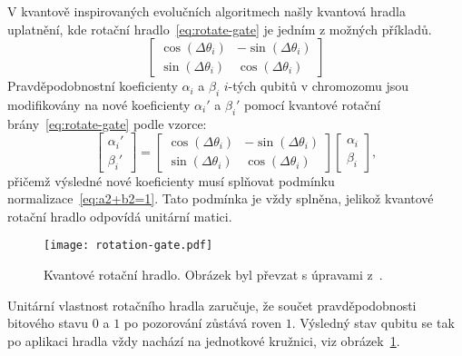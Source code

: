 V kvantově inspirovaných evolučních algoritmech našly kvantová hradla uplatnění, kde rotační hradlo~\ref{eq:rotate-gate} je jedním z možných příkladů.
\begin{equation}\label{eq:rotate-gate}
    \begin{bmatrix}
        \cos{\left( \Delta\theta_i \right)} & - \sin{\left( \Delta\theta_i \right)} \\
        \sin{\left( \Delta\theta_i \right)} &   \cos{\left( \Delta\theta_i \right)}
    \end{bmatrix}
\end{equation}
Pravděpodobnostní koeficienty $\alpha_i$ a $\beta_i$ $i$-tých qubitů v chromozomu jsou modifikovány na nové koeficienty $\alpha_i'$ a $\beta_i'$ pomocí kvantové rotační brány~\ref{eq:rotate-gate} podle vzorce: 
\begin{equation}\label{eq:rotation-gate-angles}
    \begin{bmatrix}
        \alpha_i' \\
        \beta_i' 
    \end{bmatrix}
    =
    \begin{bmatrix}
        \cos{\left( \Delta\theta_i \right)} & - \sin{\left( \Delta\theta_i \right)} \\
        \sin{\left( \Delta\theta_i \right)} &   \cos{\left( \Delta\theta_i \right)}
    \end{bmatrix}
    \begin{bmatrix}
        \alpha_i \\
        \beta_i 
    \end{bmatrix},
\end{equation}
přičemž výsledné nové koeficienty musí splňovat podmínku normalizace~\ref{eq:a2+b2=1}. 
Tato podmínka je vždy splněna, jelikož kvantové rotační hradlo odpovídá unitární matici. 
\begin{figure}[ht!]
    \centering
    \texttt{[image: rotation-gate.pdf]}
    \caption{Kvantové rotační hradlo. Obrázek byl převzat s úpravami z~\cite{NaturalComputing}.}
    \label{fig:rotation-gate}
\end{figure}
Unitární vlastnost rotačního hradla zaručuje, že součet pravděpodobnosti bitového stavu $0$ a $1$ po pozorování zůstává roven $1$. 
Výsledný stav qubitu se tak po aplikaci hradla vždy nachází na jednotkové kružnici, viz obrázek~\ref{fig:rotation-gate}.

